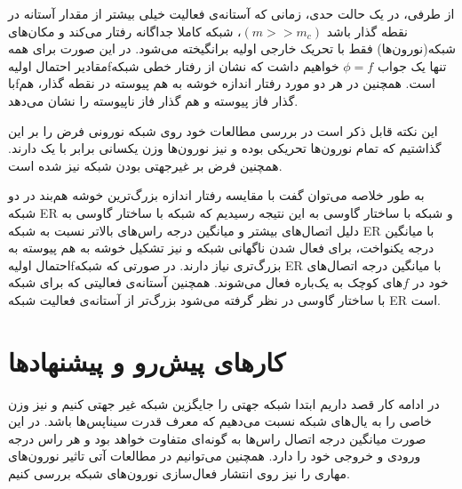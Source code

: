 \begin{aling}
\begin{center}
\]
\end{center}
\end{aling}
از طرفی، در یک حالت حدی، زمانی که آستانه‌ی فعالیت خیلی بیشتر از  مقدار  آستانه در نقطه گذار باشد $(m >> m_{c})$، شبکه کاملا جداگانه رفتار می‌کند و مکان‌های شبکه(نورون‌ها) فقط با تحریک خارجی اولیه برانگیخته می‌شود. در این صورت برای همه مقادیر احتمال اولیهfتنها یک جواب $\phi = f$  خواهیم داشت که نشان از رفتار خطی شبکه باfاست. همچنین در هر دو مورد رفتار اندازه خوشه به هم پیوسته در نقطه گذار، هم گذار فاز پیوسته و هم گذار فاز ناپیوسته را نشان می‌دهد.

این نکته قابل ذکر است در بررسی مطالعات خود روی شبکه نورونی فرض را بر این گذاشتیم که تمام نورون‌ها تحریکی بوده و نیز نورون‌ها وزن یکسانی برابر با یک دارند. همچنین فرض بر غیرجهتی بودن شبکه نیز شده است.

 به طور خلاصه می‌توان گفت با مقایسه رفتار اندازه بزرگ‌ترین خوشه هم‌بند در دو شبکه ER و شبکه با ساختار گاوسی به این نتیجه رسیدیم که شبکه با ساختار گاوسی به دلیل اتصال‌های بیشتر و میانگین درجه راس‌های بالاتر نسبت به شبکه ER با میانگین درجه یکنواخت، برای فعال شدن ناگهانی شبکه و نیز تشکیل خوشه به هم پیوسته به احتمال اولیهfبزرگ‌تری نیاز دارند. در صورتی که شبکه ER با میانگین درجه اتصال‌های خود در $f$های کوچک به یک‌باره فعال می‌شوند. همچنین آستانه‌ی فعالیتی که برای شبکه با ساختار گاوسی در نظر گرفته می‌شود بزرگ‌تر از آستانه‌ی فعالیت شبکه ER است. 
 
  \section{کار‌های پیش‌رو و پیشنهادها}
   در ادامه کار قصد داریم ابتدا شبکه جهتی را جایگزین شبکه غیر جهتی کنیم و نیز  وزن خاصی را به یال‌های شبکه نسبت می‌دهیم که معرف قدرت سیناپس‌ها باشد. در این صورت میانگین درجه اتصال راس‌ها به گونه‌ای متفاوت خواهد بود و هر راس درجه ورودی و خروجی خود را دارد. همچنین می‌توانیم در مطالعات آتی تاثیر نورون‌های مهاری را نیز روی  انتشار فعال‌سازی نورون‌های شبکه بررسی کنیم. 
   \newpage
